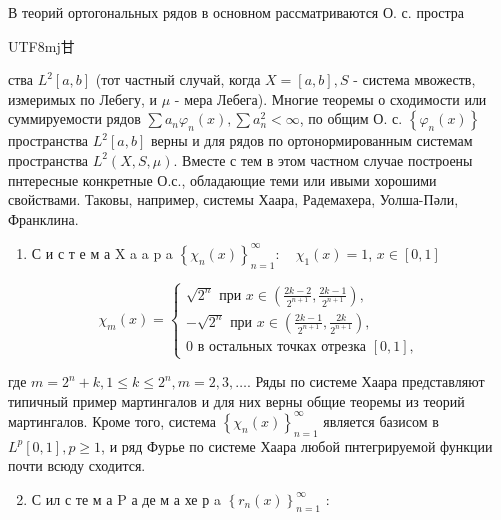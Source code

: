 \documentclass[10pt]{article}
\begin{document}
В теорий ортогональных рядов в основном рассматриваются О. с. простра\begin{CJK}{UTF8}{mj}甘\end{CJK}ства $L^{2}[a, b]$ (тот частный случай, когда $X=[a, b], S$ - система мвожеств, измеримых по Лебегу, и $\mu$ - мера Лебега). Многие теоремы о сходимости или суммируемости рядов $\sum a_{n} \varphi_{n}(x), \sum a_{n}^{2}<\infty$, по общим О. с. $\left\{\varphi_{n}(x)\right\}$ пространства $L^{2}[a, b]$ верны и для рядов по ортонормированным системам пространства $L^{2}(X, S, \mu)$. Вместе с тем в этом частном случае построены пнтересные конкретные О.с., обладающие теми или ивыми хорошими свойствами. Таковы, например, системы Хаара, Радемахера, Уолша-Пәли, Франклина.



\begin{enumerate}

  \item С и с т е м а $\mathrm{X}$ a a p a $\left\{\chi_{n}(x)\right\}_{n=1}^{\infty}: \quad \chi_{1}(x)=1$, $x \in[0,1]$

\end{enumerate}



\[

\chi_{m}(x)=\left\{\begin{array}{c}

\sqrt{2^{n}} \text { при } x \in\left(\frac{2 k-2}{2^{n+1}}, \frac{2 k-1}{2^{n+1}}\right), \\

-\sqrt{2^{n}} \text { при } x \in\left(\frac{2 k-1}{2^{n+1}}, \frac{2 k}{2^{n+1}}\right), \\

0 \text { в остальных точках отрезка }[0,1],

\end{array}\right.

\]



где $m=2^{n}+k, 1 \leqslant k \leqslant 2^{n}, m=2,3, \ldots$. Ряды по системе Хаара представляют типичный пример мартингалов и для них верны общие теоремы из теорий мартингалов. Кроме того, система $\left\{\chi_{n}(x)\right\}_{n=1}^{\infty}$ является базисом в $L^{p}[0,1], p \geqslant 1$, и ряд Фурье по системе Хаара любой пнтегрируемой функции почти всюду сходится.



\begin{enumerate}

  \setcounter{enumi}{1}

  \item С ил с те м а $\mathrm{P}$ а де м а хе р a $\left\{r_{n}(x)\right\}_{n=1}^{\infty}$ :

\end{enumerate}
\end{document}
